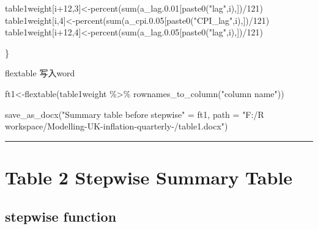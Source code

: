 \documentclass[
]{article}
\newenvironment{Shaded}{\begin{snugshade}}{\end{snugshade}}
\newcommand{\AttributeTok}[1]{\textcolor[rgb]{0.77,0.63,0.00}{#1}}
\newcommand{\DecValTok}[1]{\textcolor[rgb]{0.00,0.00,0.81}{#1}}
\newcommand{\FloatTok}[1]{\textcolor[rgb]{0.00,0.00,0.81}{#1}}
\newcommand{\FunctionTok}[1]{\textcolor[rgb]{0.00,0.00,0.00}{#1}}
\newcommand{\NormalTok}[1]{#1}
\newcommand{\OtherTok}[1]{\textcolor[rgb]{0.56,0.35,0.01}{#1}}
\newcommand{\SpecialCharTok}[1]{\textcolor[rgb]{0.00,0.00,0.00}{#1}}
\newcommand{\StringTok}[1]{\textcolor[rgb]{0.31,0.60,0.02}{#1}}
\begin{document}
\begin{Shaded}
\begin{Highlighting}[]
\NormalTok{    table1weight[i}\SpecialCharTok{+}\DecValTok{12}\NormalTok{,}\DecValTok{3}\NormalTok{]}\OtherTok{\textless{}{-}}\FunctionTok{percent}\NormalTok{(}\FunctionTok{sum}\NormalTok{(a\_lag.}\FloatTok{0.01}\NormalTok{[}\FunctionTok{paste0}\NormalTok{(}\StringTok{"lag"}\NormalTok{,i),])}\SpecialCharTok{/}\DecValTok{121}\NormalTok{)}
\NormalTok{    table1weight[i,}\DecValTok{4}\NormalTok{]}\OtherTok{\textless{}{-}}\FunctionTok{percent}\NormalTok{(}\FunctionTok{sum}\NormalTok{(a\_cpi.}\FloatTok{0.05}\NormalTok{[}\FunctionTok{paste0}\NormalTok{(}\StringTok{"CPI\_lag"}\NormalTok{,i),])}\SpecialCharTok{/}\DecValTok{121}\NormalTok{)}
\NormalTok{    table1weight[i}\SpecialCharTok{+}\DecValTok{12}\NormalTok{,}\DecValTok{4}\NormalTok{]}\OtherTok{\textless{}{-}}\FunctionTok{percent}\NormalTok{(}\FunctionTok{sum}\NormalTok{(a\_lag.}\FloatTok{0.05}\NormalTok{[}\FunctionTok{paste0}\NormalTok{(}\StringTok{"lag"}\NormalTok{,i),])}\SpecialCharTok{/}\DecValTok{121}\NormalTok{)}
    
\NormalTok{\}}
\end{Highlighting}
\end{Shaded}

flextable 写入word

\begin{Shaded}
\begin{Highlighting}[]
\NormalTok{ft1}\OtherTok{\textless{}{-}}\FunctionTok{flextable}\NormalTok{(table1weight }\SpecialCharTok{\%\textgreater{}\%} \FunctionTok{rownames\_to\_column}\NormalTok{(}\StringTok{"column name"}\NormalTok{))}




\FunctionTok{save\_as\_docx}\NormalTok{(}\StringTok{"Summary table before stepwise"} \OtherTok{=}\NormalTok{ ft1, }\AttributeTok{path =} \StringTok{"F:/R workspace/Modelling{-}UK{-}inflation{-}quarterly{-}/table1.docx"}\NormalTok{)}
\end{Highlighting}
\end{Shaded}

\begin{center}\rule{0.5\linewidth}{0.5pt}\end{center}

\hypertarget{table-2-stepwise-summary-table}{%
\section{Table 2 Stepwise Summary
Table}\label{table-2-stepwise-summary-table}}

\hypertarget{stepwise-function}{%
\subsection{stepwise function}\label{stepwise-function}}
\end{document}

